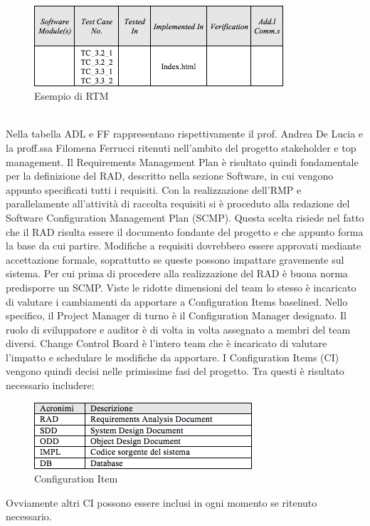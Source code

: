 \\
\begin{figure}[h]
\centering
\includegraphics[scale=.7]{img/4.png}
\caption{Esempio di RTM}
\label{fig:cd}
\end{figure}
\\
Nella tabella ADL e FF rappresentano rispettivamente il prof. Andrea De Lucia e la proff.ssa Filomena Ferrucci ritenuti nell\rq ambito del progetto stakeholder e top management.
Il Requirements Management Plan \`{e} risultato quindi fondamentale per la definizione del RAD, descritto nella sezione Software, in cui vengono appunto specificati tutti i requisiti.
Con la realizzazione dell\rq RMP e parallelamente all’attivit\`{a} di raccolta requisiti si \`{e} proceduto alla redazione del Software Configuration Management Plan (SCMP). Questa scelta risiede nel fatto che il RAD risulta essere il documento fondante del progetto e che appunto forma la base da cui partire. Modifiche a requisiti dovrebbero essere approvati mediante accettazione formale, soprattutto se queste possono impattare gravemente sul sistema.
Per cui prima di procedere alla realizzazione del RAD \`{e} buona norma predisporre un SCMP. 
Viste le ridotte dimensioni del team lo stesso è incaricato di valutare i cambiamenti da apportare a Configuration Items baselined.
Nello specifico, il Project Manager di turno è il Configuration Manager designato. Il ruolo di sviluppatore e auditor è di volta in volta assegnato a membri del team diversi.
Change Control Board è l’intero team che è incaricato di valutare l’impatto e schedulare le modifiche da apportare.
I Configuration Items (CI) vengono quindi decisi nelle primissime fasi del progetto. Tra questi è risultato necessario includere: 
\begin{figure}[h]
\centering
\includegraphics[scale=.7]{img/5.png}
\caption{Configuration Item}
\label{fig:cd}
\end{figure}
Ovviamente altri CI possono essere inclusi in ogni momento se ritenuto necessario.
